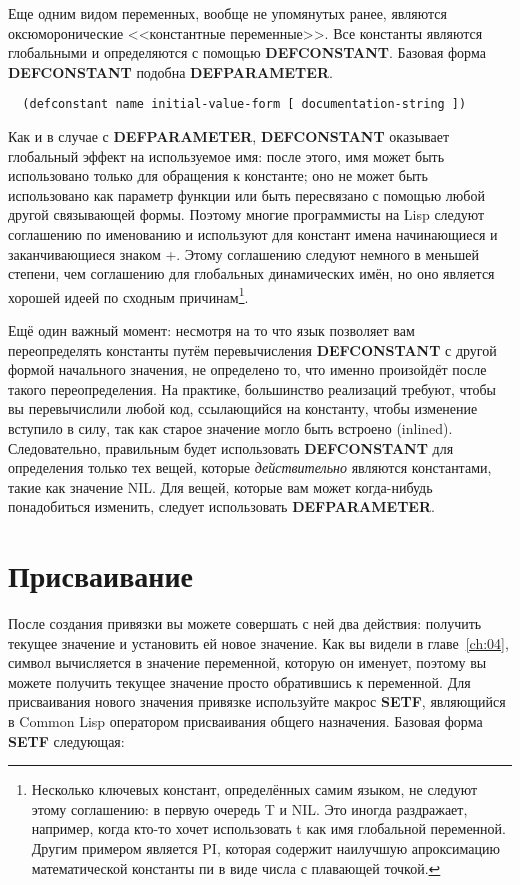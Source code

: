 Еще одним видом переменных, вообще не упомянутых ранее, являются оксюморонические
<<константные переменные>>. Все константы являются глобальными и определяются с помощью
\textbf{DEFCONSTANT}. Базовая форма \textbf{DEFCONSTANT} подобна \textbf{DEFPARAMETER}.

\begin{lstlisting}
  (defconstant name initial-value-form [ documentation-string ])
\end{lstlisting}

Как и в случае с \textbf{DEFPARAMETER}, \textbf{DEFCONSTANT} оказывает глобальный эффект
на используемое имя: после этого, имя может быть использовано только для обращения к
константе; оно не может быть использовано как параметр функции или быть пересвязано с
помощью любой другой связывающей формы. Поэтому многие программисты на Lisp следуют
соглашению по именованию и используют для констант имена начинающиеся и заканчивающиеся
знаком +. Этому соглашению следуют немного в меньшей степени, чем соглашению для
глобальных динамических имён, но оно является хорошей идеей по сходным
причинам\footnote{Несколько ключевых констант, определённых самим языком, не следуют этому
  соглашению: в первую очередь T и NIL. Это иногда раздражает, например, когда кто-то
  хочет использовать t как имя глобальной переменной. Другим примером является PI, которая
  содержит наилучшую апроксимацию математической константы пи в виде числа с плавающей
  точкой.}.

Ещё один важный момент: несмотря на то что язык позволяет вам переопределять константы
путём перевычисления \textbf{DEFCONSTANT} с другой формой начального значения, не
определено то, что именно произойдёт после такого переопределения. На практике,
большинство реализаций требуют, чтобы вы перевычислили любой код, ссылающийся на
константу, чтобы изменение вступило в силу, так как старое значение могло быть встроено
(inlined). Следовательно, правильным будет использовать \textbf{DEFCONSTANT} для
определения только тех вещей, которые \textit{действительно} являются константами, такие
как значение NIL. Для вещей, которые вам может когда-нибудь понадобиться изменить, следует
использовать \textbf{DEFPARAMETER}.

\section{Присваивание}

После создания привязки вы можете совершать с ней два действия: получить текущее значение
и установить ей новое значение. Как вы видели в главе~\ref{ch:04}, символ вычисляется в
значение переменной, которую он именует, поэтому вы можете получить текущее значение
просто обратившись к переменной. Для присваивания нового значения привязке используйте
макрос \textbf{SETF}, являющийся в Common Lisp оператором присваивания общего назначения.
Базовая форма \textbf{SETF} следующая:

